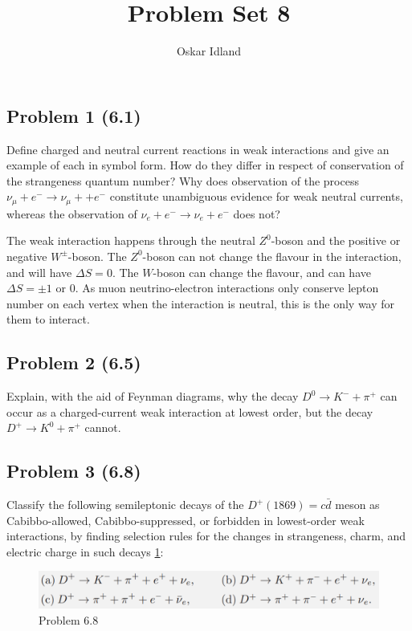 \documentclass{article}
\author{Oskar Idland}
\title{Problem Set 8}
\date{}
\begin{document}
\maketitle
\newpage

\subsection*{Problem 1 (6.1)}
\begin{mdframed}
Define charged and neutral current reactions in weak interactions and give an example of each in symbol form. How do they differ in respect of conservation of the strangeness quantum number? Why does observation of the process $ν_{μ} + e^{-} →  ν_{μ} +  + e^{-}$ constitute unambiguous evidence for weak neutral currents, whereas the observation of $ν_{e} + e^{-} →  ν_{e}  + e^{-}$ does not?
\end{mdframed}
The weak interaction happens through the neutral $Z^{0}$-boson and the positive or negative $W^{±}$-boson. The $Z^{0}$-boson can not change the flavour in the interaction, and will have $ΔS = 0$. The $W$-boson can change the flavour, and can have $ΔS = ± 1$ or $0$. As muon neutrino-electron interactions only conserve lepton number on each vertex when the interaction is neutral, this is the only way for them to interact. 

\subsection*{Problem 2 (6.5)}
\begin{mdframed}
Explain, with the aid of Feynman diagrams, why the decay $D^{0} → K^{-} + π^{+}$ can occur as a charged-current weak interaction at lowest order, but the decay $D^{+} → K^{0} + π^{+}$ cannot.
\end{mdframed}

\subsection*{Problem 3 (6.8)}
\begin{mdframed}
Classify the following semileptonic decays of the $D^{+}(1869) = c \bar{d}$ meson as Cabibbo-allowed, Cabibbo-suppressed, or forbidden in lowest-order weak interactions, by finding selection rules for the changes in strangeness, charm, and electric charge in such decays \cref{fig: 6.8}: 
\end{mdframed}
\begin{figure}[h!]
\centering
\includegraphics[width = .9\textwidth]{6.8.png}
\caption{Problem 6.8}
\label{fig: 6.8}
\end{figure}
\end{document}
